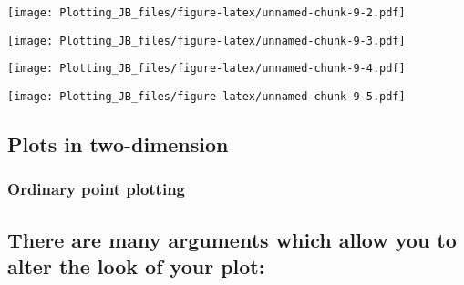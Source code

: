 \documentclass[]{article}
\newenvironment{Shaded}{\begin{snugshade}}{\end{snugshade}}
\newcommand{\DataTypeTok}[1]{\textcolor[rgb]{0.13,0.29,0.53}{#1}}
\newcommand{\KeywordTok}[1]{\textcolor[rgb]{0.13,0.29,0.53}{\textbf{#1}}}
\newcommand{\NormalTok}[1]{#1}
\newcommand{\OperatorTok}[1]{\textcolor[rgb]{0.81,0.36,0.00}{\textbf{#1}}}
\begin{document}
\texttt{[image: Plotting\_JB\_files/figure-latex/unnamed-chunk-9-2.pdf]}

\begin{Shaded}
\end{Shaded}

\texttt{[image: Plotting\_JB\_files/figure-latex/unnamed-chunk-9-3.pdf]}

\begin{Shaded}
\end{Shaded}

\texttt{[image: Plotting\_JB\_files/figure-latex/unnamed-chunk-9-4.pdf]}

\begin{Shaded}
\end{Shaded}

\texttt{[image: Plotting\_JB\_files/figure-latex/unnamed-chunk-9-5.pdf]}

\hypertarget{plots-in-two-dimension}{%
\subsection{Plots in two-dimension}\label{plots-in-two-dimension}}

\hypertarget{ordinary-point-plotting}{%
\subsubsection{Ordinary point plotting}\label{ordinary-point-plotting}}

\hypertarget{there-are-many-arguments-which-allow-you-to-alter-the-look-of-your-plot}{%
\subsection{There are many arguments which allow you to alter the look
of your
plot:}\label{there-are-many-arguments-which-allow-you-to-alter-the-look-of-your-plot}}
\end{document}
